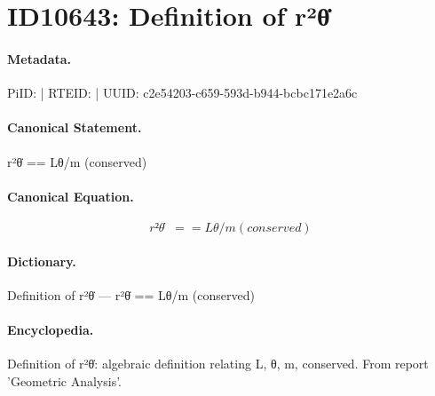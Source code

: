 \section*{ID10643: Definition of r²θ̇}
\paragraph{Metadata.}
PiID:  | RTEID:  | UUID: c2e54203-c659-593d-b944-bcbc171e2a6c

\paragraph{Canonical Statement.}
r²θ̇ == Lθ/m (conserved)

\paragraph{Canonical Equation.}
\[
r²θ̇ == Lθ/m (conserved)
\]

\paragraph{Dictionary.}
Definition of r²θ̇ — r²θ̇ == Lθ/m (conserved)

\paragraph{Encyclopedia.}
Definition of r²θ̇: algebraic definition relating L, θ, m, conserved. From report 'Geometric Analysis'.
